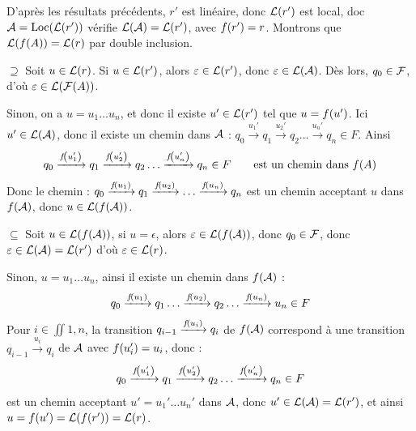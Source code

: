     \begin{nproof}
        D'après les résultats précédents, $r'$ est linéaire, donc $\mathcal{L}\!\left(r'\right)$ est local, doc $\bcA = \Loc\p{\bcL\p{r'}}$ vérifie $\mathcal{L}\!\left(\mathcal{A}\right) = \mathcal{L}\!\left(r'\right)$, avec $f\!\left(r'\right) = r$. Montrons que $\mathcal{L}\!\left(f\!\left(A\right)\right) = \mathcal{L}\!\left(r\right)$ par double inclusion.

        \begin{enumerate}
            \itt $\boxed{\supseteq}$ Soit $u \in \mathcal{L}\!\left(r\right)$. Si $u \in \mathcal{L}\!\left(r'\right)$, alors $\varepsilon \in \mathcal{L}\!\left(r'\right)$, donc $\varepsilon \in \mathcal{L}\!\left(\mathcal{A}\right)$. Dès lors, $q_0 \in \mathcal{F}$, d'où $\varepsilon \in \mathcal{L}\!\left(\mathcal{F}\!\left(A\right)\right)$.
            
            Sinon, on a $u = u_1\dots u_n$, et donc il existe $u' \in \mathcal{L}\!\left(r'\right)$ tel que $u = f\!\left(u'\right)$. Ici $u' \in \mathcal{L}\!\left(\mathcal{A}\right)$, donc il existe un chemin dans $\mathcal{A}$ : \qquad $q_0 \xrightarrow{u_1'} q_1 \xrightarrow{u_2'} q_2 \dots \xrightarrow{u_n'} q_n \in F$. Ainsi 
            \[ q_0 \xrightarrow{f\!\left(u_1'\right)} q_1 \xrightarrow{f\!\left(u_2'\right)} q_2 \dots \xrightarrow{f\!\left(u_n'\right)} q_n \in F \qquad \text{est un chemin dans} \ f\!\left(A\right)\]
            Donc le chemin : \qquad $q_0 \xrightarrow{f\!\left(u_1\right)} q_1 \xrightarrow{f\!\left(u_2\right)} \dots \xrightarrow{f\!\left(u_n\right)} q_n$ est un chemin acceptant $u$ dans $f\!\left(\mathcal{A}\right)$, donc $u \in \mathcal{L}\!\left(f\!\left(\mathcal{A}\right)\right)$.
            
            \itt $\boxed{\subseteq}$ Soit $u \in \mathcal{L}\!\left(f\!\left(\mathcal{A}\right)\right)$, si $u = \epsilon$, alors $\varepsilon \in \mathcal{L}\!\left(f\!\left(\mathcal{A}\right)\right)$, donc $q_0 \in \mathcal{F}$, donc $\varepsilon \in \mathcal{L}\!\left(\mathcal{A}\right) = \mathcal{L}\!\left(r'\right)$ d'où $\varepsilon \in \mathcal{L}\!\left(r\right)$.
            
            Sinon, $u = u_1 \dots u_n$, ainsi il existe un chemin dans $f\!\left(\mathcal{A}\right)$ :
            \[ q_0 \xrightarrow{f\!\left(u_1\right)} q_1 \dots \xrightarrow{f\!\left(u_2\right)} q_2 \dots \xrightarrow{f\!\left(u_n\right)} u_n \in F\]
            Pour $i \in \iint{1, n}$, la transition $q_{i-1} \xrightarrow{f\!\left(u_i\right)} q_i$ de $f\!\left(\mathcal{A}\right)$ correspond à une transition $q_{i-1} \xrightarrow{u_i} q_i$ de $\mathcal{A}$ avec $f\!\left(u_i'\right) = u_i$, donc :
            \[ q_0 \xrightarrow{f\!\left(u_1'\right)} q_1 \xrightarrow{f\!\left(u_2'\right)} q_2 \dots \xrightarrow{f\!\left(u_n'\right)} q_n \in F\]
            est un chemin acceptant $u' = u_1'\dots u_n'$ dans $\mathcal{A}$, donc $u' \in \mathcal{L}\!\left(\mathcal{A}\right) = \mathcal{L}\!\left(r'\right)$, et ainsi $u = f\!\left(u'\right) = \mathcal{L}\!\left(f\!\left(r'\right)\right) = \mathcal{L}\!\left(r\right)$.
        \end{enumerate}
    \end{nproof}
    
